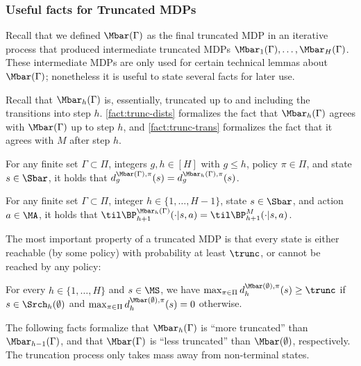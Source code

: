 \subsubsection{Useful facts for Truncated MDPs}

Recall that we defined $\Mbar(\Gamma)$ as the final truncated MDP in an iterative process that produced intermediate truncated MDPs $\Mbar_1(\Gamma),\dots,\Mbar_H(\Gamma)$. These intermediate MDPs are only used for certain technical lemmas about $\Mbar(\Gamma)$; nonetheless it is useful to state several facts for later use. 

Recall that $\Mbar_h(\Gamma)$ is, essentially, truncated up to and including the transitions into step $h$. \cref{fact:trunc-dists} formalizes the fact that $\Mbar_h(\Gamma)$ agrees with $\Mbar(\Gamma)$ up to step $h$, and \cref{fact:trunc-trans} formalizes the fact that it agrees with $M$ after step $h$.

\begin{fact}\label{fact:trunc-dists}
For any finite set $\Gamma \subset \Pi$, integers $g,h \in [H]$ with $g \leq h$, policy $\pi \in \Pi$, and state $s \in \Sbar$, it holds that $d^{\Mbar(\Gamma),\pi}_g(s) = d^{\Mbar_h(\Gamma),\pi}_g(s)$.
\end{fact}

\begin{fact}\label{fact:trunc-trans}
For any finite set $\Gamma \subset \Pi$, integer $h \in \{1,\dots,H-1\}$, state $s \in \Sbar$, and action $a \in \MA$, it holds that $\til \BP^{\Mbar_h(\Gamma)}_{h+1}(\cdot|s,a) = \til\BP^M_{h+1}(\cdot|s,a)$.
\end{fact}

The most important property of a truncated MDP is that every state is either reachable (by some policy) with probability at least $\trunc$, or cannot be reached by any policy:

\begin{fact}\label{fact:trunc-reachability}
For every $h \in \{1,\dots,H\}$ and $s \in \MS$, we have $\max_{\pi\in\Pi} d^{\Mbar(\emptyset),\pi}_h(s) \geq \trunc$ if $s \in \Srch_h(\emptyset)$ and $\max_{\pi\in\Pi} d^{\Mbar(\emptyset),\pi}_h(s) = 0$ otherwise.
\end{fact}

The following facts formalize that $\Mbar_h(\Gamma)$ is ``more truncated'' than $\Mbar_{h-1}(\Gamma)$, and that $\Mbar(\Gamma)$ is ``less truncated'' than $\Mbar(\emptyset)$, respectively. The truncation process only takes mass away from non-terminal states.

